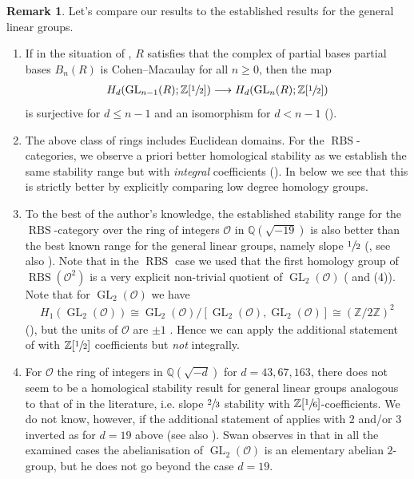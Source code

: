 \documentclass[12pt, reqno]{amsart}
\theoremstyle{plain}
\theoremstyle{definition}
\newtheorem{remark}[theorem]{Remark}
\newcommand{\Z}{\mathbb Z}
\newcommand{\Q}{\mathbb Q}
\begin{document}
\begin{remark}\label{compare with GL}
Let's compare our results to the established results for the general linear groups.
\begin{enumerate}
\item If in the situation of , $R$ satisfies that the complex of partial bases partial bases $B_n(R)$ is Cohen–Macaulay for all $n\geq 0$, then the map
\begin{align*}
H_d(\operatorname{GL}_{n-1}(R); \Z[\sfrac{1}{2}])\longrightarrow H_d(\operatorname{GL}_n(R); \Z[\sfrac{1}{2}])
\end{align*}
is surjective for $d\leq n-1$ and an isomorphism for $d< n-1$ (\cite[Theorem 1.3]{BernardMillerSroka}).
\item The above class of rings includes Euclidean domains. For the $\operatorname{RBS}$-categories, we observe a priori better homological stability as we establish the same stability range but with \textit{integral} coefficients (). In  below we see that this is strictly better by explicitly comparing low degree homology groups.
\item To the best of the author's knowledge, the established stability range for the $\operatorname{RBS}$-category over the ring of integers $\mathcal{O}$ in $\Q(\sqrt{-19})$ is also better than the best known range for the general linear groups, namely slope $\sfrac{1}{2}$ (\cite[Theorem 4.11]{vanderKallen}, see also \cite[Theorem 18.1]{GalatiusKupersRandalWilliams}). Note that in the $\operatorname{RBS}$ case we used that the first homology group of $\operatorname{RBS}(\mathcal{O}^2)$ is a very explicit non-trivial quotient of $\operatorname{GL}_2(\mathcal{O})$ ( and  (4)). Note that for $\operatorname{GL}_2(\mathcal{O})$ we have
\begin{align*}
H_1(\operatorname{GL}_2(\mathcal{O}))\cong\operatorname{GL}_2(\mathcal{O})/[\operatorname{GL}_2(\mathcal{O}),\operatorname{GL}_2(\mathcal{O})]\cong (\Z/2\Z)^2
\end{align*}
(\cite[Corollary 16.3]{Swan71}), but the units of $\mathcal{O}$ are $\pm 1$ . Hence we can apply the additional statement of \cite[Theorem 18.1]{GalatiusKupersRandalWilliams} with $\Z[\sfrac{1}{2}]$ coefficients but \textit{not} integrally.
\item For $\mathcal{O}$ the ring of integers in $\Q(\sqrt{-d})$ for $d=43,67, 163$, there does not seem to be a homological stability result for general linear groups analogous to that of  in the literature, i.e. slope $\sfrac{2}{3}$ stability with $\Z[\sfrac{1}{6}]$-coefficients. We do not know, however, if the additional statement of \cite[Theorem 18.1]{GalatiusKupersRandalWilliams} applies with $2$ and/or $3$ inverted as for $d=19$ above (see also \cite[Example 18.2]{GalatiusKupersRandalWilliams}). Swan observes in \cite[\S 17]{Swan71} that in all the examined cases the abelianisation of $\operatorname{GL}_2(\mathcal{O})$ is an elementary abelian $2$-group, but he does not go beyond the case $d=19$.

\end{enumerate}
\end{remark}
\end{document}
